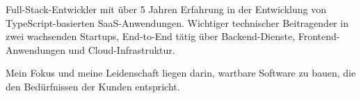\documentclass[8pt]{developercv} %
\newcommand{\linebreaksmall}{\vspace{2mm}}
\begin{document}
\vspace{0.5cm}



\begin{minipage}[t]{0.4\textwidth} %
	\vspace{-\baselineskip} %
	
Full-Stack-Entwickler mit über 5 Jahren Erfahrung in der Entwicklung von TypeScript-basierten SaaS-Anwendungen. 
Wichtiger technischer Beitragender in zwei wachsenden Startups, End-to-End tätig über Backend-Dienste, Frontend-Anwendungen und Cloud-Infrastruktur. 

\linebreaksmall

Mein Fokus und meine Leidenschaft liegen darin, wartbare Software zu bauen, die den Bedürfnissen der Kunden entspricht.

\end{minipage}
\hfill %
\begin{minipage}[t]{0.5\textwidth} %
	\vspace{-\baselineskip} %
	\begin{barchart}{5.5}
	\end{barchart}
\end{minipage}



\end{document}
